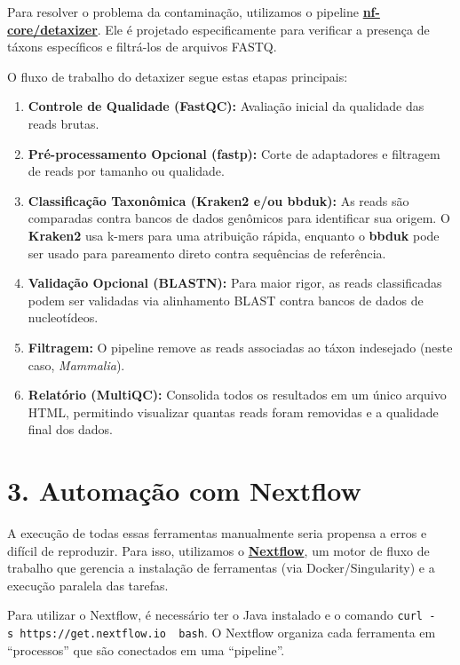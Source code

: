 \documentclass[
  letterpaper,
  DIV=11,
  numbers=noendperiod]{scrreprt}
\providecommand{\tightlist}{%
  \setlength{\itemsep}{0pt}\setlength{\parskip}{0pt}}
\begin{document}
Para resolver o problema da contaminação, utilizamos o pipeline
\href{https://nf-co.re/detaxizer/}{\textbf{nf-core/detaxizer}}. Ele é
projetado especificamente para verificar a presença de táxons
específicos e filtrá-los de arquivos FASTQ.

O fluxo de trabalho do detaxizer segue estas etapas principais:

\begin{enumerate}
\def\labelenumi{\arabic{enumi}.}
\tightlist
\item
  \textbf{Controle de Qualidade (FastQC):} Avaliação inicial da
  qualidade das reads brutas.
\item
  \textbf{Pré-processamento Opcional (fastp):} Corte de adaptadores e
  filtragem de reads por tamanho ou qualidade.
\item
  \textbf{Classificação Taxonômica (Kraken2 e/ou bbduk):} As reads são
  comparadas contra bancos de dados genômicos para identificar sua
  origem. O \textbf{Kraken2} usa k-mers para uma atribuição rápida,
  enquanto o \textbf{bbduk} pode ser usado para pareamento direto contra
  sequências de referência.
\item
  \textbf{Validação Opcional (BLASTN):} Para maior rigor, as reads
  classificadas podem ser validadas via alinhamento BLAST contra bancos
  de dados de nucleotídeos.
\item
  \textbf{Filtragem:} O pipeline remove as reads associadas ao táxon
  indesejado (neste caso, \emph{Mammalia}).
\item
  \textbf{Relatório (MultiQC):} Consolida todos os resultados em um
  único arquivo HTML, permitindo visualizar quantas reads foram
  removidas e a qualidade final dos dados.
\end{enumerate}

\section{3. Automação com Nextflow}\label{automauxe7uxe3o-com-nextflow}

A execução de todas essas ferramentas manualmente seria propensa a erros
e difícil de reproduzir. Para isso, utilizamos o
\href{https://nextflow.io/}{\textbf{Nextflow}}, um motor de fluxo de
trabalho que gerencia a instalação de ferramentas (via
Docker/Singularity) e a execução paralela das tarefas.

\begin{tcolorbox}[enhanced jigsaw, arc=.35mm, bottomrule=.15mm, bottomtitle=1mm, breakable, colback=white, colbacktitle=quarto-callout-note-color!10!white, colframe=quarto-callout-note-color-frame, coltitle=black, left=2mm, leftrule=.75mm, opacityback=0, opacitybacktitle=0.6, rightrule=.15mm, title=\textcolor{quarto-callout-note-color}{\faInfo}\hspace{0.5em}{Ponto Importante}, titlerule=0mm, toprule=.15mm, toptitle=1mm]

Para utilizar o Nextflow, é necessário ter o Java instalado e o comando
\texttt{curl\ -s\ https://get.nextflow.io\ \textbar{}\ bash}. O Nextflow
organiza cada ferramenta em ``processos'' que são conectados em uma
``pipeline''.

\end{tcolorbox}
\end{document}
